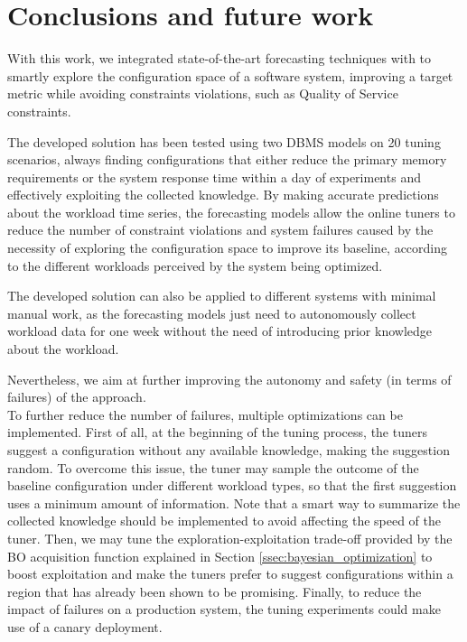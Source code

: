 \documentclass[a4paper, 12pt]{article} %
\begin{document}
	\section{Conclusions and future work}
	With this work, we integrated state-of-the-art forecasting techniques with \cite{AkamasCGP} to smartly explore the configuration space of a software system, improving a target metric while avoiding constraints violations, such as Quality of Service constraints. 
	
	The developed solution has been tested using two DBMS models on 20 tuning scenarios, always finding configurations that either reduce the primary memory requirements or the system response time within a day of experiments and effectively exploiting the collected knowledge. By making accurate predictions about the workload time series, the forecasting models allow the online tuners to reduce the number of constraint violations and system failures caused by the necessity of exploring the configuration space to improve its baseline, according to the different workloads perceived by the system being optimized. 
	
	The developed solution can also be applied to different systems with minimal manual work, as the forecasting models just need to autonomously collect workload data for one week without the need of introducing prior knowledge about the workload.
	
	Nevertheless, we aim at further improving the autonomy and safety (in terms of failures) of the approach. \\	
	To further reduce the number of failures, multiple optimizations can be implemented. First of all, at the beginning of the tuning process, the tuners suggest a configuration without any available knowledge, making the suggestion random. To overcome this issue, the tuner may sample the outcome of the baseline configuration under different workload types, so that the first suggestion uses a minimum amount of information. Note that a smart way to summarize the collected knowledge should be implemented to avoid affecting the speed of the tuner. Then, we may tune the exploration-exploitation trade-off provided by the BO acquisition function explained in Section \ref{ssec:bayesian_optimization} to boost exploitation and make the tuners prefer to suggest configurations within a region that has already been shown to be promising. Finally, to reduce the impact of failures on a production system, the tuning experiments could make use of a canary deployment.
	
\end{document}
